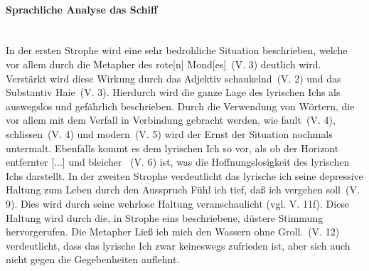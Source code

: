 \documentclass[11pt,a4paper]{report}
\begin{document}
	\clearpage
	\thispagestyle{empty}
	\paragraph{Sprachliche Analyse \dq das Schiff\dq} \mbox{} \\
	In der ersten Strophe wird eine sehr bedrohliche Situation beschrieben, welche vor allem durch die Metapher des \dq rote[n] Mond[es]\dq\ (V. 3) deutlich wird.
	Verstärkt wird diese Wirkung durch das Adjektiv \dq schaukelnd\dq\ (V. 2) und das Substantiv \dq Haie\dq\ (V. 3).
	Hierdurch wird die ganze Lage des lyrischen Ichs als auswegslos und gefährlich beschrieben.
	Durch die Verwendung von Wörtern, die vor allem mit dem Verfall in Verbindung gebracht werden, wie \dq fault\dq\ (V. 4), \dq schlissen\dq\ (V. 4) und \dq modern\dq\ (V. 5) wird der Ernst der Situation nochmals untermalt.
	Ebenfalls kommt es dem lyrischen Ich so vor, als ob der Horizont \dq entfernter [...] und bleicher \dq\ (V. 6) ist, was die Hoffnungslosigkeit des lyrischen Ichs darstellt.
	In der zweiten Strophe verdeutlicht das lyrische ich seine depressive Haltung zum Leben durch den Ausspruch \dq Fühl ich tief, daß ich vergehen soll\dq\ (V. 9).
	Dies wird durch seine wehrlose Haltung veranschaulicht (vgl. V. 11f).
	Diese Haltung wird durch die, in Strophe eins beschriebene, düstere Stimmung hervorgerufen.
	Die Metapher \dq Ließ ich mich den Wassern ohne Groll.\dq\ (V. 12)	 verdeutlicht, dass das lyrische Ich zwar keineswegs zufrieden ist, aber sich auch nicht gegen die Gegebenheiten auflehnt.
	
\end{document}
